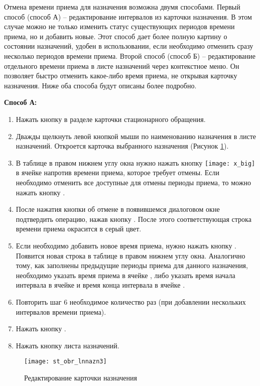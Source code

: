 Отмена времени приема для назначения возможна двумя способами. Первый способ (способ А) – редактирование интервалов из карточки назначения. В этом случае можно не только изменить статус существующих периодов времени приема, но и добавить новые. Этот способ дает более полную картину о состоянии назначений, удобен в использовании, если необходимо отменить сразу несколько периодов времени приема. Второй способ (способ Б) – редактирование отдельного времени приема в листе назначений через контекстное меню. Он позволяет быстро отменить какое-либо время приема, не открывая карточку назначения. Ниже оба способа будут описаны более подробно.

\textbf{Способ А:}
\begin{enumerate}
 \item Нажать кнопку  в разделе  карточки стационарного обращения.
 \item Дважды щелкнуть левой кнопкой мыши по наименованию назначения в листе назначений. Откроется карточка выбранного назначения (Рисунок  \ref{img_st_obr_lnnazn3}).
 \item В таблице  в правом нижнем углу окна нужно нажать кнопку \texttt{[image: x\_big]} в ячейке  напротив времени приема, которое требует отмены. Если необходимо отменить все доступные для отмены периоды приема, то можно нажать кнопку .
 \item После нажатия кнопки об отмене в появившемся диалоговом окне подтвердить операцию, нажав кнопку . После этого соответствующая строка времени приема окрасится в серый цвет.
 \item Если необходимо добавить новое время приема, нужно нажать кнопку . Появится новая строка в таблице  в правом нижнем углу окна. Аналогично тому, как заполнены предыдущие периоды приема для данного назначения, необходимо указать время приема в ячейке , либо указать время начала интервала в ячейке  и время конца интервала в ячейке .
 \item Повторить шаг 6 необходимое количество раз (при добавлении нескольких интервалов времени приема).
 \item Нажать кнопку .
 \item Нажать кнопку  листа назначений.
\end{enumerate}

\begin{figure}[ht]\centering
   \texttt{[image: st\_obr\_lnnazn3]}
   \caption{Редактирование карточки назначения}
   \label{img_st_obr_lnnazn3}
\end{figure} 

